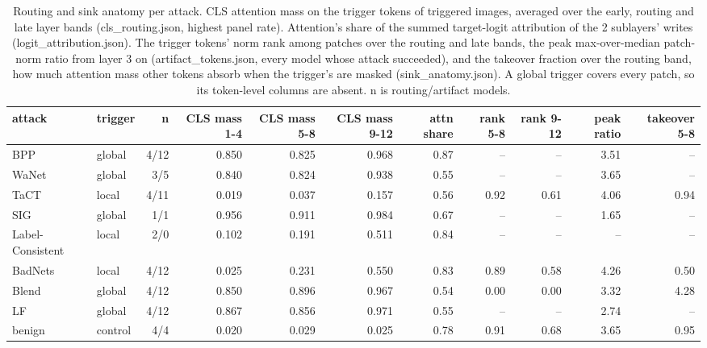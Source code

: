 \begin{table}[htbp]
\centering
\small
\caption{Routing and sink anatomy per attack. CLS attention mass on the trigger tokens of triggered images, averaged over the early, routing and late layer bands (cls\_routing.json, highest panel rate). Attention's share of the summed target-logit attribution of the 2 sublayers' writes (logit\_attribution.json). The trigger tokens' norm rank among patches over the routing and late bands, the peak max-over-median patch-norm ratio from layer 3 on (artifact\_tokens.json, every model whose attack succeeded), and the takeover fraction over the routing band, how much attention mass other tokens absorb when the trigger's are masked (sink\_anatomy.json). A global trigger covers every patch, so its token-level columns are absent. n is routing/artifact models.}
\label{tab:routing}
\begin{adjustbox}{max width=\linewidth}
\begin{tabular}{llrrrrrrrrr}
\toprule
attack & trigger & n & CLS mass 1-4 & CLS mass 5-8 & CLS mass 9-12 & attn share & rank 5-8 & rank 9-12 & peak ratio & takeover 5-8 \\
\midrule
BPP & global & 4/12 & 0.850 & 0.825 & 0.968 & 0.87 & -- & -- & 3.51 & -- \\
WaNet & global & 3/5 & 0.840 & 0.824 & 0.938 & 0.55 & -- & -- & 3.65 & -- \\
TaCT & local & 4/11 & 0.019 & 0.037 & 0.157 & 0.56 & 0.92 & 0.61 & 4.06 & 0.94 \\
SIG & global & 1/1 & 0.956 & 0.911 & 0.984 & 0.67 & -- & -- & 1.65 & -- \\
Label-Consistent & local & 2/0 & 0.102 & 0.191 & 0.511 & 0.84 & -- & -- & -- & -- \\
BadNets & local & 4/12 & 0.025 & 0.231 & 0.550 & 0.83 & 0.89 & 0.58 & 4.26 & 0.50 \\
Blend & global & 4/12 & 0.850 & 0.896 & 0.967 & 0.54 & 0.00 & 0.00 & 3.32 & 4.28 \\
LF & global & 4/12 & 0.867 & 0.856 & 0.971 & 0.55 & -- & -- & 2.74 & -- \\
benign & control & 4/4 & 0.020 & 0.029 & 0.025 & 0.78 & 0.91 & 0.68 & 3.65 & 0.95 \\
\bottomrule
\end{tabular}
\end{adjustbox}
\end{table}
